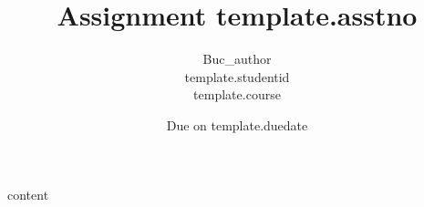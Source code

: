 \documentclass[a4paper,10pt]{article}
\author{ {{Buc_author}}\\ {{template.studentid}} \quad {{template.upi}}\\{{template.course}} }
\date{Due on {{template.duedate}} }
\title{Assignment {{template.asstno}} }
\theoremstyle{definition}
\begin{document}
\maketitle

{{content}}
\end{document}
